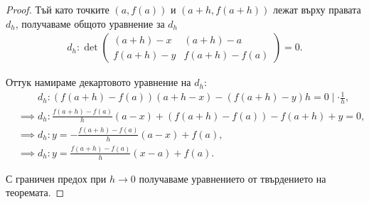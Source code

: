 \documentclass{../../common/topic}
\begin{document}
\begin{proof}
  Тъй като точките \( (a, f(a)) \) и \( (a+h, f(a+h)) \) лежат върху правата \( d_h \), получаваме общото уравнение за \( d_h \)
    \begin{align*}
      d_h: \det \begin{pmatrix}
      (a+h)-x & (a+h)-a \\
      f(a+h)-y & f(a+h)-f(a)
    \end{pmatrix}
    = 0.
  \end{align*}

  Оттук намираме декартовото уравнение на \( d_h \):
  \begin{align*}
    &\phantom{{}\implies{}} d_h: (f(a+h) - f(a)) (a+h-x) - (f(a+h)-y)h = 0 \mid \cdot \frac 1 h,
    \\
    &\implies d_h: \frac {f(a+h) - f(a)} h (a-x) + (f(a+h) - f(a)) - f(a+h) + y = 0,
    \\
    &\implies d_h: y = -\frac {f(a+h) - f(a)} h (a-x) + f(a),
    \\
    &\implies d_h: y = \frac {f(a+h) - f(a)} h (x-a) + f(a).
  \end{align*}

  С граничен предох при \( h \to 0 \) получаваме уравнението от твърдението на теоремата.
\end{proof}
\end{document}

